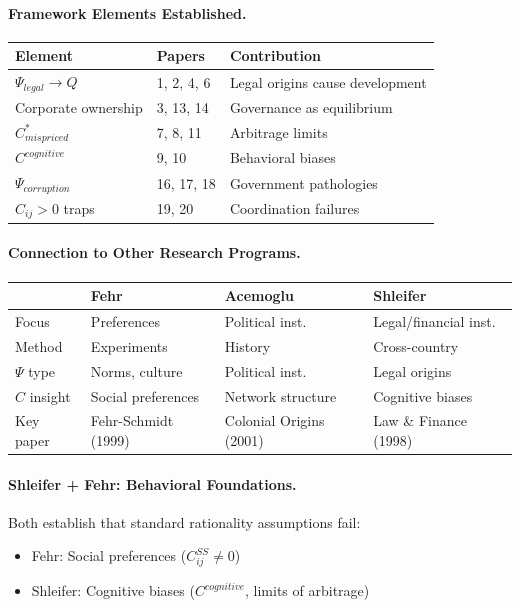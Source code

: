 \paragraph{Framework Elements Established.}

\begin{center}
\renewcommand{\arraystretch}{1.2}
\small
\begin{tabular}{lll}
\hline
\textbf{Element} & \textbf{Papers} & \textbf{Contribution} \\
\hline
$\Psi_{legal} \to Q$ & 1, 2, 4, 6 & Legal origins cause development \\
Corporate ownership & 3, 13, 14 & Governance as equilibrium \\
$C^*_{mispriced}$ & 7, 8, 11 & Arbitrage limits \\
$C^{cognitive}$ & 9, 10 & Behavioral biases \\
$\Psi_{corruption}$ & 16, 17, 18 & Government pathologies \\
$C_{ij} > 0$ traps & 19, 20 & Coordination failures \\
\hline
\end{tabular}
\end{center}

\paragraph{Connection to Other Research Programs.}

\begin{center}
\renewcommand{\arraystretch}{1.2}
\begin{tabular}{llll}
\hline
& \textbf{Fehr} & \textbf{Acemoglu} & \textbf{Shleifer} \\
\hline
Focus & Preferences & Political inst. & Legal/financial inst. \\
Method & Experiments & History & Cross-country \\
$\Psi$ type & Norms, culture & Political inst. & Legal origins \\
$C$ insight & Social preferences & Network structure & Cognitive biases \\
Key paper & Fehr-Schmidt (1999) & Colonial Origins (2001) & Law \& Finance (1998) \\
\hline
\end{tabular}
\end{center}

\paragraph{Shleifer + Fehr: Behavioral Foundations.}
Both establish that standard rationality assumptions fail:
\begin{itemize}
  \item Fehr: Social preferences ($C^{SS}_{ij} \neq 0$)
  \item Shleifer: Cognitive biases ($C^{cognitive}$, limits of arbitrage)
\end{itemize}

